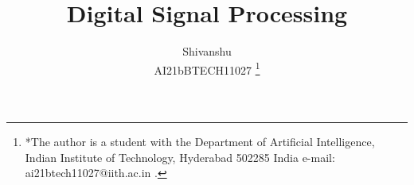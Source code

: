 \documentclass[journal,12pt,twocolumn]{IEEEtran}
\begin{document}

\def\putbox#1#2#3{\makebox[0in][l]{\makebox[#1][l]{}\raisebox{\baselineskip}[0in][0in]{\raisebox{#2}[0in][0in]{#3}}}}
\def\rightbox#1{\makebox[0in][r]{#1}}
\def\centbox#1{\makebox[0in]{#1}}
\def\topbox#1{\raisebox{-\baselineskip}[0in][0in]{#1}}
\def\midbox#1{\raisebox{-0.5\baselineskip}[0in][0in]{#1}}

\vspace{3cm}

\title{
     Digital Signal Processing
}


%
%
%

\author{ Shivanshu \\ AI21bBTECH11027 %
     \thanks{*The author is a student with the Department
          of Artificial Intelligence, Indian Institute of Technology, Hyderabad
          502285 India e-mail:  ai21btech11027@iith.ac.in
          .}%
}
% 
%
\end{document}
